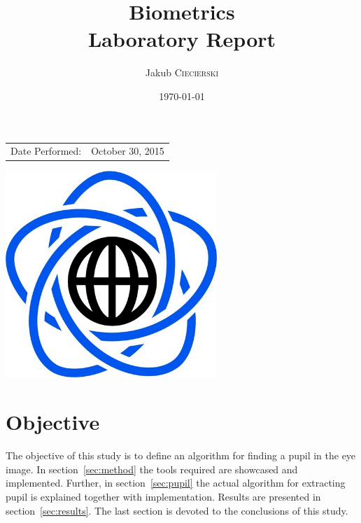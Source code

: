 \documentclass{article}
\title{Biometrics \\ Laboratory Report} %
\author{Jakub \textsc{Ciecierski}} %
\date{\today} %
\begin{document}
\maketitle %

\begin{center}
\begin{tabular}{l r}
Date Performed: & October 30, 2015 \\ %
\end{tabular}

\vspace{60pt}
\includegraphics[width=80mm]{res/mini.PNG} \\
\end{center}


\newpage

	\tableofcontents
	
\newpage


\section{Objective}
The objective of this study is to define an algorithm for finding a pupil in the eye image. In section~\ref{sec:method} the tools required are showcased and implemented. Further, in section~\ref{sec:pupil} the actual algorithm for extracting pupil is explained together with implementation. Results are presented in section~\ref{sec:results}. The last section is devoted to the conclusions of this study.
\end{document}
